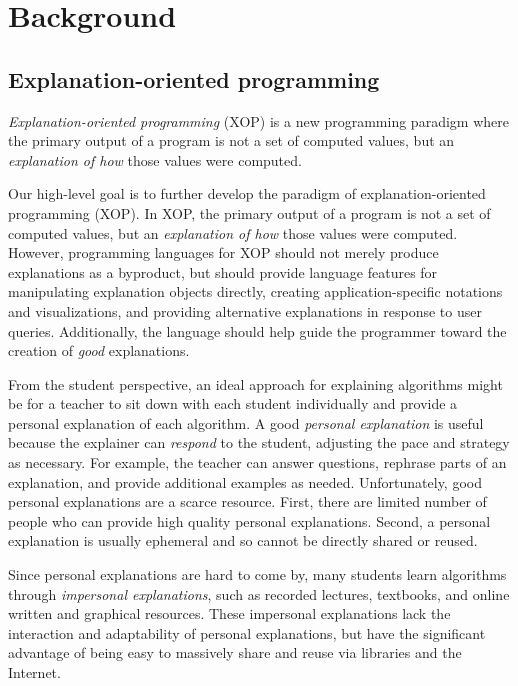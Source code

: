 \documentclass[conference]{IEEEtran}
\begin{document}
\section{Background}
\label{sec:back}

\subsection{Explanation-oriented programming}
\label{sec:back:xop}

\emph{Explanation-oriented programming} (XOP) is a new programming paradigm
where the primary output of a program is not a set of computed values, but an
\emph{explanation of how} those values were computed. 


Our high-level goal is to further develop the paradigm of explanation-oriented
programming (XOP). In XOP, the primary output of a program is not a set of
computed values, but an \emph{explanation of how} those values were computed.
However, programming languages for XOP should not merely produce explanations
as a byproduct, but should provide language features for manipulating
explanation objects directly, creating application-specific notations and
visualizations, and providing alternative explanations in response to user
queries. Additionally, the language should help guide the programmer toward the
creation of \emph{good} explanations.


From the student perspective, an ideal approach for explaining algorithms might
be for a teacher to sit down with each student individually and provide a
personal explanation of each algorithm. A good \emph{personal explanation} is
useful because the explainer can \emph{respond} to the student, adjusting the
pace and strategy as necessary. For example, the teacher can answer questions,
rephrase parts of an explanation, and provide additional examples as needed.
%
Unfortunately, good personal explanations are a scarce resource. First, there
are limited number of people who can provide high quality personal
explanations. Second, a personal explanation is usually ephemeral and so cannot
be directly shared or reused.


Since personal explanations are hard to come by, many students learn algorithms
through \emph{impersonal explanations}, such as recorded lectures, textbooks,
and online written and graphical resources.
%
These impersonal explanations lack the interaction and adaptability of personal
explanations, but have the significant advantage of being easy to massively
share and reuse via libraries and the Internet.
\end{document}
